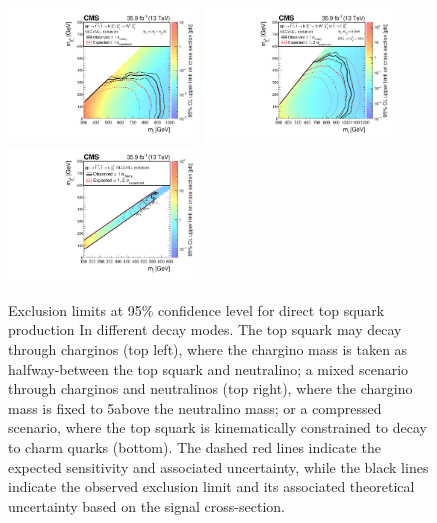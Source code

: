 \begin{figure}
	\centering
	\includegraphics[width=0.45\textwidth]{results/figs/interpretations/T2bW_35p9ifb_Moriond2017_Mar07_XSEC}
	\includegraphics[width=0.45\textwidth]{results/figs/interpretations/T2bt_35p9ifb_Moriond2017_Mar07_XSEC}
	\includegraphics[width=0.45\textwidth]{results/figs/interpretations/T2cc_35p9ifb_Moriond2017_Mar07_XSEC}
	\caption{Exclusion limits at 95\% confidence level for direct top squark production In different decay modes. The top squark may decay through charginos (top left), where the chargino mass is taken as halfway-between the top squark and neutralino; a mixed scenario through charginos and neutralinos (top right), where the chargino mass is fixed to 5\GeV above the neutralino mass; or a compressed scenario, where the top squark is kinematically constrained to decay to charm quarks (bottom). The dashed red lines indicate the expected sensitivity and associated uncertainty, while the black lines indicate the observed exclusion limit and its associated theoretical uncertainty based on the signal cross-section.}
	\label{fig:limitsStop}
\end{figure}


